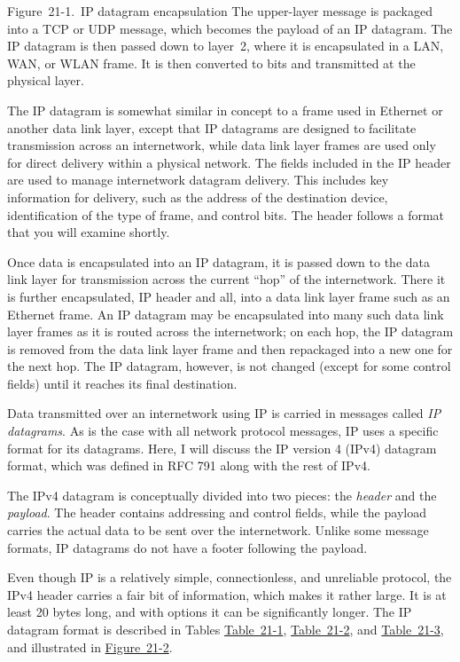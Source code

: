 Figure~21-1.~IP datagram encapsulation The upper-layer message is
packaged into a TCP or UDP message, which becomes the payload of an IP
datagram. The IP datagram is then passed down to layer~2, where it is
encapsulated in a LAN, WAN, or WLAN frame. It is then converted to bits
and transmitted at the physical layer.

The IP datagram is somewhat similar in concept to a frame used in
Ethernet or another data link layer, except that IP datagrams are
designed to facilitate transmission across an internetwork, while data
link layer frames are used only for direct delivery within a physical
network. The fields included in the IP header are used to manage
internetwork datagram delivery. This includes key information for
delivery, such as the address of the destination device, identification
of the type of frame, and control bits. The header follows a format that
you will examine shortly.

Once data is encapsulated into an IP datagram, it is passed down to the
data link layer for transmission across the current ``hop'' of the
internetwork. There it is further encapsulated, IP header and all, into
a data link layer frame such as an Ethernet frame. An IP datagram may be
encapsulated into many such data link layer frames as it is routed
across the internetwork; on each hop, the IP datagram is removed from
the data link layer frame and then repackaged into a new one for the
next hop. The IP datagram, however, is not changed (except for some
control fields) until it reaches its final destination.

\protect\hypertarget{ch21s02.html}{}{}

Data transmitted over an internetwork using IP is carried in messages
called {\emph{IP datagrams}}. As is the case with all network protocol
messages, IP uses a specific
\protect\hypertarget{ch21s02.htmlux5cux23idx-CHP-21-0776}{}{}format for
its datagrams. Here, I will discuss the IP version 4 (IPv4) datagram
\protect\hypertarget{ch21s02.htmlux5cux23idx-CHP-21-0777}{}{}format,
which was defined in RFC 791 along with the rest of IPv4.

The IPv4 datagram is conceptually divided into two pieces: the
{\emph{header}} and the {\emph{payload}}. The header contains addressing
and control fields, while the payload carries the actual data to be sent
over the internetwork. Unlike some message formats, IP datagrams do not
have a footer following the payload.

Even though IP is a relatively simple, connectionless, and unreliable
protocol, the IPv4 header carries a fair bit of information, which makes
it rather large. It is at least 20 bytes long, and with options it can
be significantly longer. The IP datagram format is described in Tables
\protect\hyperlink{ch21s02.htmlux5cux23internet_protocol_version__ipv_datagram}{Table~21-1},
\protect\hyperlink{ch21s02.htmlux5cux23ipv_flags_subfields}{Table~21-2},
and
\protect\hyperlink{ch21s02.htmlux5cux23ipv_protocol_subfields}{Table~21-3},
and illustrated in
\protect\hyperlink{ch21s02.htmlux5cux23ipv4_datagram_format_this_diagram_shows_}{Figure~21-2}.

